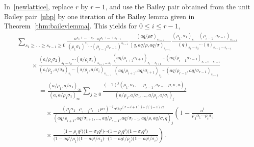 \documentclass[pdftex]{sigma}
\numberwithin{equation}{section}
\begin{document}
In~\eqref{newlattice}, replace $r$ by $r-1$, and use the Bailey pair obtained from the unit Bailey pair~\eqref{ubp} by one iteration of the Bailey lemma given in Theorem~\ref{thm:baileylemma}. This yields for $0\leq i\leq r-1$,
\begin{gather}
\sum_{s_1\geq\dots\geq s_{r-1}\geq0}\frac{a^{s_1+\dots+s_{r-1}}q^{s_{i}+\dots+s_{r-1}}}{(\rho_1\sigma_1)^{s_1}\cdots(\rho_{r-1}\sigma_{r-1})^{s_{r-1}}}
\frac{(aq/\rho\sigma)_{s_{r-1}}}{(q,aq/\rho,aq/\sigma)_{s_{r-1}}}\frac{(\rho_1,\sigma_1)_{s_1}\cdots(\rho_{r-1}, \sigma_{r-1})_{s_{r-1}}}{(q)_{s_1-s_2}\cdots(q)_{s_{r-2}-s_{r-1}}}\nonumber\\
\qquad{}\times\frac{(a/\rho_2\sigma_2)_{s_1-s_2}\cdots(a/\rho_i\sigma_i)_{s_{i-1}-s_i}}{(a/\rho_2,a/\sigma_2)_{s_1}
\cdots(a/\rho_i,a/\sigma_i)_{s_{i-1}}}\frac{(aq/\rho_{i+1}\sigma_{i+1})_{s_i-s_{i+1}}\cdots(aq/\rho_{r-1} \sigma_{r-1})_{s_{r-2}-s_{r-1}}}{(aq/\rho_{i+1},aq/\sigma_{i+1})_{s_i}
\cdots(aq/\rho_{r-1},aq/\sigma_{r-1})_{s_{r-2}}}\nonumber\\
\phantom{\qquad{}\times}{}=\frac{(a/\rho_1,a/\sigma_1)_\infty}{(a,a/\rho_1\sigma_1)_\infty}
\sum_{j\geq0}\frac{(-1)^j(\rho_1,\sigma_1,\dots,\rho_{r-1},\sigma_{r-1},\rho,\sigma,a)_j}{(a/\rho_1,a/\sigma_1,\dots,a/\rho_i,a/\sigma_i)_j}\nonumber\\
\phantom{\qquad{}\times=}{}\times\frac{(\rho_1\sigma_1\cdots\rho_{r-1}\sigma_{r-1}\rho\sigma)^{-j}a^{rj}q^{(r-i+1)j+j(j-1)/2}}{(aq/\rho_{i+1},aq/\sigma_{i+1},
\dots,aq/\rho_{r-1},aq/\sigma_{r-1},aq/\rho,aq/\sigma,q)_j}\left(1-\frac{a^{i}}{\rho_1\sigma_1\cdots\rho_i\sigma_i}\right.\nonumber\\
\phantom{\qquad{}\times=}{}\times\left.\frac{\bigl(1-\rho_1q^j\bigr)\bigl(1-\sigma_1q^j\bigr)
\cdots\bigl(1-\rho_iq^j\bigr)\bigl(1-\sigma_iq^j\bigr)}{\bigl(1-aq^j/\rho_1\bigr)\bigl(1-aq^j/\sigma_1\bigr) \cdots\bigl(1-aq^j/\rho_i\bigr)\bigl(1-aq^j/\sigma_i\bigr)}\right).\label{newlattice2}
\end{gather}
\end{document}

